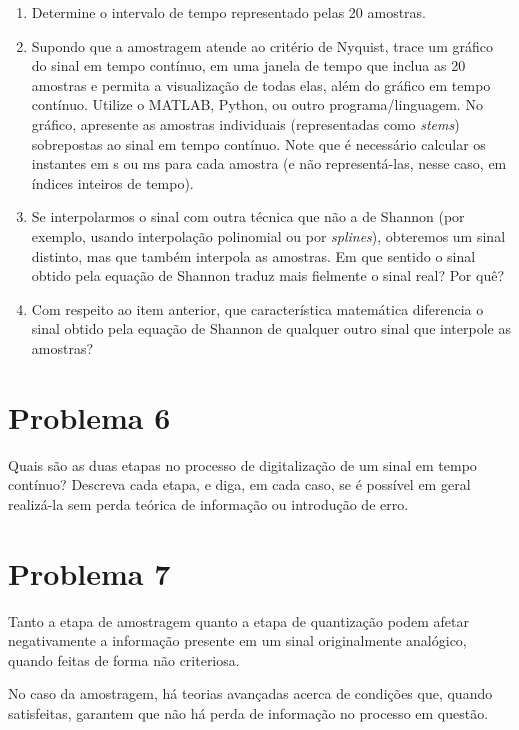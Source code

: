 \documentclass[12pt,a4paper]{article}
\begin{document}
\begin{enumerate}
  \item Determine o intervalo de tempo representado pelas 20 amostras.

  \item Supondo que a amostragem atende ao critério de Nyquist, trace um gráfico do sinal em tempo
        contínuo, em uma janela de tempo que inclua as 20 amostras e permita a visualização de
        todas elas, além do gráfico em tempo contínuo. Utilize o MATLAB, Python, ou outro
        programa/linguagem. No gráfico, apresente as amostras individuais (representadas como
        \textit{stems}) sobrepostas ao sinal em tempo contínuo. Note que é necessário calcular os
        instantes em s ou ms para cada amostra (e não representá-las, nesse caso, em índices
        inteiros de tempo).

  \item Se interpolarmos o sinal com outra técnica que não a de Shannon (por exemplo, usando
        interpolação polinomial ou por \textit{splines}), obteremos um sinal distinto, mas que
        também interpola as amostras. Em que sentido o sinal obtido pela equação de Shannon traduz
        mais fielmente o sinal real? Por quê?

  \item Com respeito ao item anterior, que característica matemática diferencia o sinal obtido
        pela equação de Shannon de qualquer outro sinal que interpole as amostras?
\end{enumerate}

\section{Problema 6}
Quais são as duas etapas no processo de digitalização de um sinal em tempo contínuo? Descreva cada
etapa, e diga, em cada caso, se é possível em geral realizá-la sem perda teórica de informação ou
introdução de erro.

\section{Problema 7}
Tanto a etapa de amostragem quanto a etapa de quantização podem afetar negativamente a informação
presente em um sinal originalmente analógico, quando feitas de forma não criteriosa.

No caso da amostragem, há teorias avançadas acerca de condições que, quando satisfeitas, garantem
que não há perda de informação no processo em questão.
\end{document}
